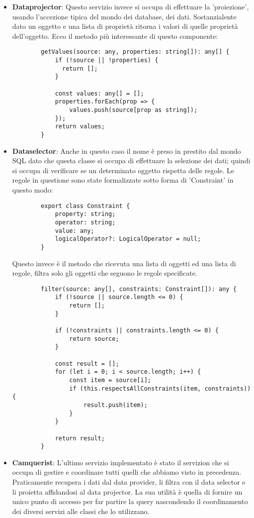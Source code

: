 \begin{itemize}
    \item {\bfseries Dataprojector}:
    Questo servizio invece si occupa di effettuare la 'proiezione', usando l'accezione tipica del mondo dei database, dei dati.
    Sostanzialente dato un oggetto e una lista di proprietà ritorna i valori di quelle proprietà dell'oggetto.
    Ecco il metodo più interessante di questo componente:
    \begin{lstlisting}
        getValues(source: any, properties: string[]): any[] {
            if (!source || !properties) {
              return [];
            }

            const values: any[] = [];
            properties.forEach(prop => {
                values.push(source[prop as string]);
            });
            return values;
        }
    \end{lstlisting}

    \item {\bfseries Dataselector}:
    Anche in questo caso il nome è preso in prestito dal mondo SQL dato che questa classe si occupa di effettuare la selezione dei dati;
    quindi si occupa di verificare se un determinato oggetto rispetta delle regole.
    Le regole in questione sono state formalizzate sotto forma di 'Constraint' in questo modo:

    \begin{lstlisting}
        export class Constraint {
            property: string;
            operator: string;
            value: any;
            logicalOperator?: LogicalOperator = null;
        }
    \end{lstlisting}

    Questo invece è il metodo che ricevuta una lista di oggetti ed una lista di regole, filtra solo gli oggetti che seguono le regole specificate.
    \begin{lstlisting}
        filter(source: any[], constraints: Constraint[]): any {
            if (!source || source.length <= 0) {
                return [];
            }

            if (!constraints || constraints.length <= 0) {
                return source;
            }

            const result = [];
            for (let i = 0; i < source.length; i++) {
                const item = source[i];
                if (this.respectsAllConstraints(item, constraints)) {
                    result.push(item);
                }
            }

            return result;
        }
    \end{lstlisting}

    \item {\bfseries Camquerist}:
    L'ultimo servizio implementato è stato il servizion che si occupa di gestire e coordinare tutti quelli che abbiamo visto in precedenza.
    Praticamente recupera i dati dal data provider, li filtra con il data selector e li proietta affidandosi al data projector.
    La sua utilità è quella di fornire un unico punto di accesso per far partire la query nascondendo il coordinamento dei diversi servizi alle classi che lo utilizzano.

\end{itemize}

